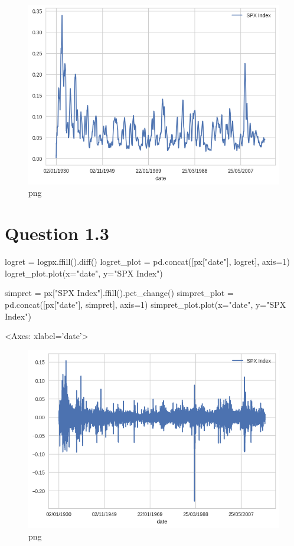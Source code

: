 \begin{figure}[h]
\centering
\includegraphics[scale=0.75]{ProcessingStockPriceData_files/ProcessingStockPriceData_5_3.png}
\caption{png}
\end{figure}

\hypertarget{question-1.3}{%
\section{Question 1.3}\label{question-1.3}}

\begin{python}[language=Python]
logret = logpx.ffill().diff()
logret_plot = pd.concat([px["date"], logret], axis=1)
logret_plot.plot(x="date", y="SPX Index")

simpret = px["SPX Index"].ffill().pct_change()
simpret_plot = pd.concat([px["date"], simpret], axis=1)
simpret_plot.plot(x="date", y="SPX Index")
\end{python}

\begin{python}
<Axes: xlabel='date'>
\end{python}

\begin{figure}[h]
\centering
\includegraphics[scale=0.75]{ProcessingStockPriceData_files/ProcessingStockPriceData_7_1.png}
\caption{png}
\end{figure}

